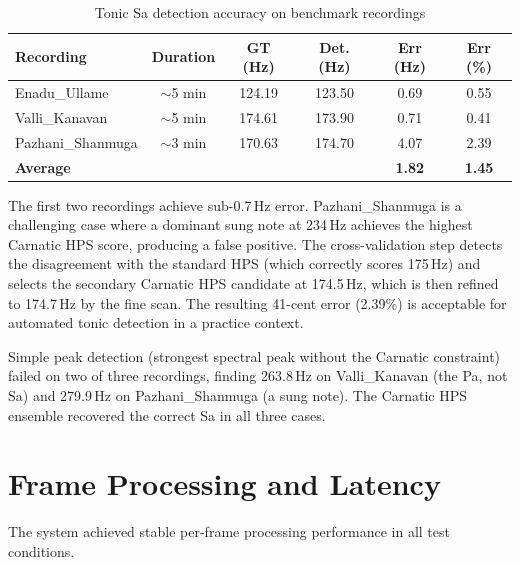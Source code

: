 \documentclass[12pt,a4paper]{report}
\numberwithin{equation}{chapter}
\begin{document}
\begin{table}[htbp]
\centering
\caption{Tonic Sa detection accuracy on benchmark recordings}
\label{tab:tonic-results}
\small
\begin{tabular}{|l|c|c|c|c|c|}
\hline
\textbf{Recording} & \textbf{Duration} & \textbf{GT (Hz)} & \textbf{Det. (Hz)} & \textbf{Err (Hz)} & \textbf{Err (\%)} \\
\hline
Enadu\_Ullame      & $\sim$5 min & 124.19 & 123.50 & 0.69 & 0.55 \\
Valli\_Kanavan     & $\sim$5 min & 174.61 & 173.90 & 0.71 & 0.41 \\
Pazhani\_Shanmuga  & $\sim$3 min & 170.63 & 174.70 & 4.07 & 2.39 \\
\hline
\textbf{Average}   &             &        &        & \textbf{1.82} & \textbf{1.45} \\
\hline
\end{tabular}
\end{table}

The first two recordings achieve sub-0.7\,Hz error. Pazhani\_Shanmuga is a challenging case where a dominant sung note at 234\,Hz achieves the highest Carnatic HPS score, producing a false positive. The cross-validation step detects the disagreement with the standard HPS (which correctly scores 175\,Hz) and selects the secondary Carnatic HPS candidate at 174.5\,Hz, which is then refined to 174.7\,Hz by the fine scan. The resulting 41-cent error (2.39\%) is acceptable for automated tonic detection in a practice context.

Simple peak detection (strongest spectral peak without the Carnatic constraint) failed on two of three recordings, finding 263.8\,Hz on Valli\_Kanavan (the Pa, not Sa) and 279.9\,Hz on Pazhani\_Shanmuga (a sung note). The Carnatic HPS ensemble recovered the correct Sa in all three cases.

\section{Frame Processing and Latency}
The system achieved stable per-frame processing performance in all test conditions.
\end{document}
